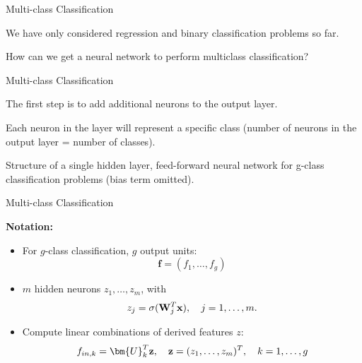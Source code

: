 \documentclass[11pt,compress,t,notes=noshow, xcolor=table]{beamer}
\begin{document}



\begin{framei}[sep=L]{Multi-class Classification}
\vfill
\item We have only considered regression and binary classification problems so far.
\vfill
\item How can we get a neural network to perform multiclass classification?
\vfill
\end{framei}

\begin{framei} {Multi-class Classification}
\item The first step is to add additional neurons to the output layer.
\item Each neuron in the layer will represent a specific class (number of neurons in the output layer = number of classes).
\centerline{\footnotesize Structure of a single hidden layer, feed-forward neural network for g-class classification problems (bias term omitted).}
\end{framei}

\begin{framei} {Multi-class Classification}
\vfill
\item \textbf{Notation:}
\begin{itemize}
\item For $g$-class classification, $g$ output units: $$\mathbf{f} = (f_1, \dots, f_g)$$
\item $m$ hidden neurons $z_1, \dots, z_m$, with
    $$ z_j = \sigma(\mathbf{W}_j^T \mathbf{x}), \quad j = 1,\ldots,m. $$
\item Compute linear combinations of derived features $z$:
    $$ f_{in,k} = \bm{U}_k^T \hidz, \quad \hidz=(z_1,\dots, z_m)^T, \quad k = 1,\ldots,g$$
\end{itemize}
\end{framei}
\end{document}

